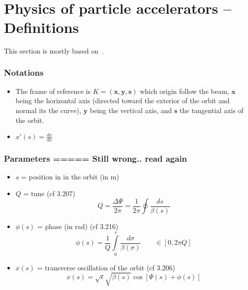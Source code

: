 \documentclass[12pt,a4paper]{memoir}
\author{\theauthor}
\title{\thetitle}
\begin{document}
\frontmatter
\clearpage
\thispagestyle{empty}
\maketitle
\
\vfill
\begin{abstract}
       ......
\end{abstract}
\vfill

\cleardoublepage

\tableofcontents
\listoffigures

\mainmatter





\chapter{Physics of particle accelerators -- Definitions}
This section is mostly based on~\cite{book:wille}.

\subsection{Notations}
\begin{itemize}
	\item The frame of reference is $K = (\mathbf{x},\mathbf{y},\mathbf{s})$ which origin follow the beam, $\mathbf{x}$ being the horizontal axis (directed toward the exterior of the orbit and normal its the curve), $\mathbf{y}$ being the vertical axis, and $\mathbf{s}$ the tangential axis of the orbit.
	\item $x'(s) = \frac{dx}{ds}$
\end{itemize}

\subsection{Parameters ===== Still wrong.. read again}
\begin{itemize}
	\item $s$ = position in in the orbit (in m)
	\item $Q$ = tune (cf 3.207)
	\begin{equation}
		Q = \frac{\Delta \Psi}{2 \pi}= \frac{1}{2 \pi} \oint \frac{ds}{\beta(s)}
	\end{equation}
	
	\item $\phi(s)$ = phase (in rad)  (cf 3.216)
	\begin{equation}
		\phi(s) = \frac{1}{Q} \int\limits_{0}^s \frac{d\sigma}{\beta(\sigma)} \qquad \in [0, 2 \pi Q]
	\end{equation}
	
	\item $x(s)$ = transverse oscillation of the orbit (cf 3.206) 
	\begin{equation}
		x(s) = \sqrt{\epsilon}\sqrt{\beta(s)}\cos[\Psi(s)+\phi(s)]
	\end{equation}
\end{itemize}
\end{document}

